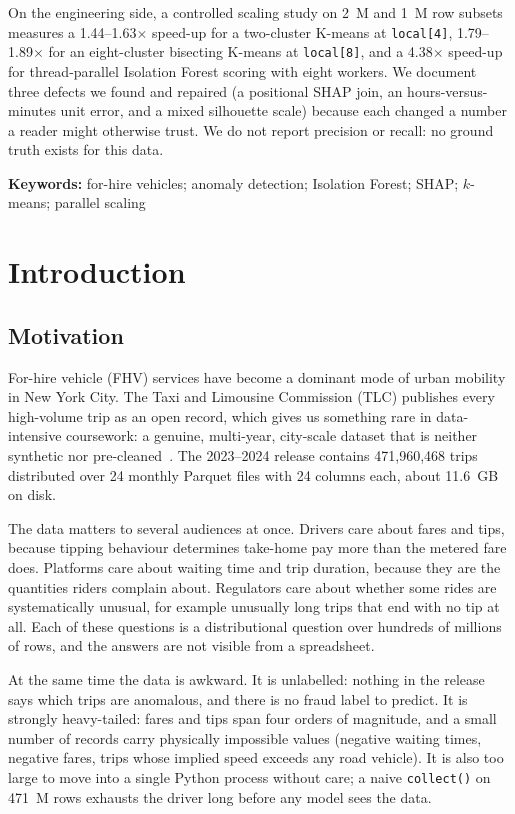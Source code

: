 \documentclass[11pt,a4paper]{article}
\newcommand{\code}[1]{\texttt{\small #1}}
\begin{document}
On the engineering side, a controlled scaling study on 2~M and 1~M row subsets measures a 1.44--1.63$\times$ speed-up for a two-cluster K-means at \code{local[4]}, 1.79--1.89$\times$ for an eight-cluster bisecting K-means at \code{local[8]}, and a 4.38$\times$ speed-up for thread-parallel Isolation Forest scoring with eight workers. We document three defects we found and repaired (a positional SHAP join, an hours-versus-minutes unit error, and a mixed silhouette scale) because each changed a number a reader might otherwise trust. We do not report precision or recall: no ground truth exists for this data.\par
\endgroup

\vspace{0.15em}
{\small\textbf{Keywords:} for-hire vehicles; anomaly detection; Isolation Forest; SHAP; $k$-means; parallel scaling}

\section{Introduction}

\subsection{Motivation}

For-hire vehicle (FHV) services have become a dominant mode of urban mobility in New York City. The Taxi and Limousine Commission (TLC) publishes every high-volume trip as an open record, which gives us something rare in data-intensive coursework: a genuine, multi-year, city-scale dataset that is neither synthetic nor pre-cleaned~\cite{tlc}. The 2023--2024 release contains 471{,}960{,}468 trips distributed over 24 monthly Parquet files with 24 columns each, about 11.6~GB on disk.

The data matters to several audiences at once. Drivers care about fares and tips, because tipping behaviour determines take-home pay more than the metered fare does. Platforms care about waiting time and trip duration, because they are the quantities riders complain about. Regulators care about whether some rides are systematically unusual, for example unusually long trips that end with no tip at all. Each of these questions is a distributional question over hundreds of millions of rows, and the answers are not visible from a spreadsheet.

At the same time the data is awkward. It is unlabelled: nothing in the release says which trips are anomalous, and there is no fraud label to predict. It is strongly heavy-tailed: fares and tips span four orders of magnitude, and a small number of records carry physically impossible values (negative waiting times, negative fares, trips whose implied speed exceeds any road vehicle). It is also too large to move into a single Python process without care; a naive \code{collect()} on 471~M rows exhausts the driver long before any model sees the data.
\end{document}
